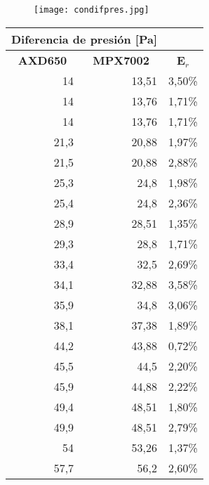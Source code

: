 \begin{figure}[htb]
	\centering
	\texttt{[image: condifpres.jpg]}
	\label{fig:condifpres}
\end{figure}

\begin{table}[h!]%
		\centering
		\begin{tabular}{|r|r|r}
			\cline{1-2}
			\multicolumn{2}{|c|}{Diferencia de presión {[}Pa{]}} & \multicolumn{1}{c}{} \\ \hline
			\multicolumn{1}{|c|}{\textbf{AXD650}} & \multicolumn{1}{c|}{\textbf{MPX7002}} & \multicolumn{1}{c|}{\textbf{E$_r$}} \\ \hline
			14 & 13,51 & \multicolumn{1}{r|}{3,50\%} \\ \hline
			14 & 13,76 & \multicolumn{1}{r|}{1,71\%} \\ \hline
			14 & 13,76 & \multicolumn{1}{r|}{1,71\%} \\ \hline
			21,3 & 20,88 & \multicolumn{1}{r|}{1,97\%} \\ \hline
			21,5 & 20,88 & \multicolumn{1}{r|}{2,88\%} \\ \hline
			25,3 & 24,8 & \multicolumn{1}{r|}{1,98\%} \\ \hline
			25,4 & 24,8 & \multicolumn{1}{r|}{2,36\%} \\ \hline
			28,9 & 28,51 & \multicolumn{1}{r|}{1,35\%} \\ \hline
			29,3 & 28,8 & \multicolumn{1}{r|}{1,71\%} \\ \hline
			33,4 & 32,5 & \multicolumn{1}{r|}{2,69\%} \\ \hline
			34,1 & 32,88 & \multicolumn{1}{r|}{3,58\%} \\ \hline
			35,9 & 34,8 & \multicolumn{1}{r|}{3,06\%} \\ \hline
			38,1 & 37,38 & \multicolumn{1}{r|}{1,89\%} \\ \hline
			44,2 & 43,88 & \multicolumn{1}{r|}{0,72\%} \\ \hline
			45,5 & 44,5 & \multicolumn{1}{r|}{2,20\%} \\ \hline
			45,9 & 44,88 & \multicolumn{1}{r|}{2,22\%} \\ \hline
			49,4 & 48,51 & \multicolumn{1}{r|}{1,80\%} \\ \hline
			49,9 & 48,51 & \multicolumn{1}{r|}{2,79\%} \\ \hline
			54 & 53,26 & \multicolumn{1}{r|}{1,37\%} \\ \hline
			57,7 & 56,2 & \multicolumn{1}{r|}{2,60\%} \\ \hline

\end{tabular}
\end{table}

